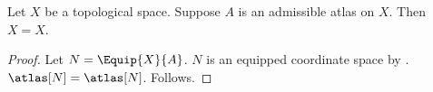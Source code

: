 

\begin{proposition}\label{ordinary_alias_projection_stays_ambiguous}
    Let $X$ be a topological space.
    Suppose $A$ is an admissible atlas on $X$.
    Then $X=X$.
\end{proposition}
\begin{proof}
    Let $N=\Equip{X}{A}$.
    $N$ is an equipped coordinate space by .
    $\atlas[N]=\atlas[N]$.
    Follows.
\end{proof}
